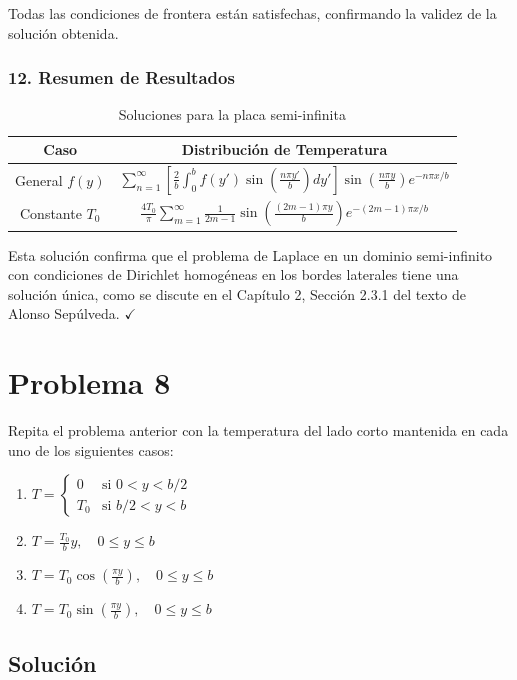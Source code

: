 \documentclass[a4paper]{article}
\begin{document}
Todas las condiciones de frontera están satisfechas, confirmando la validez de la solución obtenida.

\subsubsection{12. Resumen de Resultados}

\begin{table}[h]
\centering
\begin{tabular}{|c|c|}
\hline
\textbf{Caso} & \textbf{Distribución de Temperatura} \\
\hline
General $f(y)$ & $\displaystyle \sum_{n=1}^{\infty} \left[\frac{2}{b}\int_0^b f(y')\sin\left(\frac{n\pi y'}{b}\right)dy'\right] \sin\left(\frac{n\pi y}{b}\right) e^{-n\pi x/b}$ \\
\hline
Constante $T_0$ & $\displaystyle \frac{4T_0}{\pi} \sum_{m=1}^{\infty} \frac{1}{2m-1} \sin\left(\frac{(2m-1)\pi y}{b}\right) e^{-(2m-1)\pi x/b}$ \\
\hline
\end{tabular}
\caption{Soluciones para la placa semi-infinita}
\end{table}

Esta solución confirma que el problema de Laplace en un dominio semi-infinito con condiciones de Dirichlet homogéneas en los bordes laterales tiene una solución única, como se discute en el Capítulo 2, Sección 2.3.1 del texto de Alonso Sepúlveda. $\checkmark$

\section{Problema 8}
Repita el problema anterior con la temperatura del lado corto mantenida en cada uno de los siguientes casos:
\begin{enumerate}
    \item[(a)] $T = \begin{cases} 0 & \text{si } 0 < y < b/2 \\ T_0 & \text{si } b/2 < y < b \end{cases}$
    \item[(b)] $T = \frac{T_0}{b} y, \quad 0 \leq y \leq b$
    \item[(c)] $T = T_0 \cos\left(\frac{\pi y}{b}\right), \quad 0 \leq y \leq b$
    \item[(d)] $T = T_0 \sin\left(\frac{\pi y}{b}\right), \quad 0 \leq y \leq b$
\end{enumerate}

\subsection{Solución}
\end{document}
